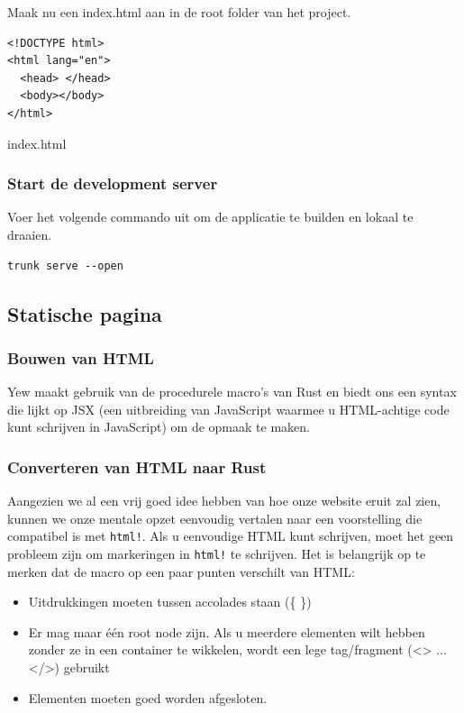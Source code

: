 Maak nu een index.html aan in de root folder van het project.

\begin{listing}[h]
\begin{verbatim}
<!DOCTYPE html>
<html lang="en">
  <head> </head>
  <body></body>
</html>
\end{verbatim}
\caption{index.html}
\end{listing}

\subsubsection{Start de development server}

Voer het volgende commando uit om de applicatie te builden en lokaal te draaien.

\begin{verbatim}
trunk serve --open
\end{verbatim}

\subsection{Statische pagina}

\subsubsection{Bouwen van HTML}

Yew maakt gebruik van de procedurele macro's van Rust en biedt ons een syntax die lijkt op JSX (een
uitbreiding van JavaScript waarmee u HTML-achtige code kunt schrijven in JavaScript) om de opmaak te
maken.

\clearpage

\subsubsection{Converteren van HTML naar Rust}

Aangezien we al een vrij goed idee hebben van hoe onze website eruit zal zien, kunnen we onze
mentale opzet eenvoudig vertalen naar een voorstelling die compatibel is met
\texttt{html!}. Als u eenvoudige HTML kunt schrijven, moet het geen probleem zijn om
markeringen in \texttt{html!} te schrijven. Het is belangrijk op te merken dat de macro op
een paar punten verschilt van HTML:
\begin{itemize}
  \item Uitdrukkingen moeten tussen accolades staan (\{ \})
  \item Er mag maar één root node zijn. Als u
    meerdere elementen wilt hebben zonder ze in een container te wikkelen, wordt een lege
    tag/fragment (<> ... </>) gebruikt
  \item Elementen moeten goed worden afgesloten.
\end{itemize}

